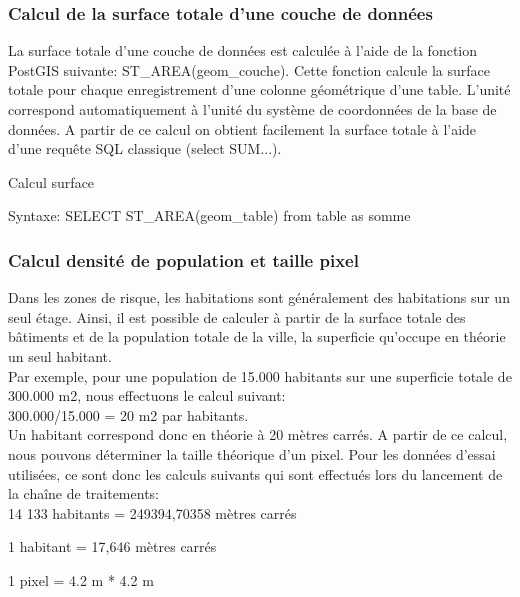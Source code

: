 \subsubsection{Calcul de la surface totale d'une couche de données}

La surface totale d'une couche de données est calculée à l'aide de la fonction PostGIS suivante: ST\_AREA(geom\_couche). Cette fonction calcule la surface totale pour chaque enregistrement d'une colonne géométrique d'une table. L'unité correspond automatiquement à l'unité du système de coordonnées de la base de données. A partir de ce calcul on obtient facilement la surface totale à l'aide d'une requête SQL classique (select SUM...).\\

\begin{algorithm}[H]
\caption{\label{traitementstat1} Calcul surface}
Syntaxe:
SELECT ST\_AREA(geom\_table) from table as somme\\
\end{algorithm}

\subsubsection{Calcul densité de population et taille pixel} 

Dans les zones de risque, les habitations sont généralement des habitations sur un seul étage. Ainsi, il est possible de calculer à partir de la surface totale des bâtiments et de la population totale de la ville, la superficie qu'occupe en théorie un seul habitant. \\
Par exemple, pour une population de 15.000 habitants sur une superficie totale de 300.000 m2, nous effectuons le calcul suivant: \\

300.000/15.000 = 20 m2 par habitants.\\

Un habitant correspond donc en théorie à 20 mètres carrés. A partir de ce calcul, nous pouvons déterminer la taille théorique d'un pixel. Pour les données d'essai utilisées, ce sont donc les calculs suivants qui sont effectués lors du lancement de la chaîne de traitements: \\
 
14 133 habitants =  249394,70358 mètres carrés  

1 habitant = 17,646 mètres carrés

1 pixel = 4.2 m * 4.2 m\\

